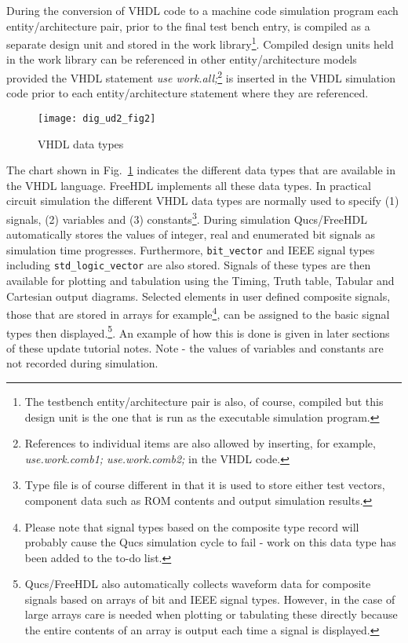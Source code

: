 During the conversion of VHDL code to a machine code simulation program each  entity/architecture pair, prior to the final test bench entry, is compiled as a separate design unit and stored in the work library\footnote{The testbench entity/architecture pair is also, of course, compiled but this design unit is the one that is run as the executable simulation program.}.  Compiled design units held in the work library can be referenced in other entity/architecture models provided the VHDL statement  \textit{use work.all;}\footnote{References to individual items are also allowed by inserting, for example, \textit{use.work.comb1; use.work.comb2;} in the VHDL code.} is inserted in the VHDL simulation code prior to each entity/architecture statement where they are referenced.
\newpage 
{} 


\FloatBarrier 
\begin{figure}[ht] 
  \centering 
  \texttt{[image: dig\_ud2\_fig2]} 
  \caption{VHDL data types} 
  \label{fig:ud2_fig2}
\end{figure} 
\FloatBarrier

The chart shown in Fig.~\ref{fig:ud2_fig2} indicates the different data types that are available in the VHDL language. FreeHDL implements all these data types. In practical circuit simulation the different VHDL data types are normally used to specify (1) signals, (2) variables and (3) constants\footnote{Type file is of course different in that it is used to store either test vectors, component data such as ROM contents and output simulation results.}. During simulation Qucs/FreeHDL automatically stores the values of integer, real and enumerated bit signals as simulation time progresses.  Furthermore, \verb|bit_vector| and IEEE signal types including \verb|std_logic_vector| are also stored.  Signals of these types are then available for plotting and tabulation using the Timing, Truth table, Tabular and Cartesian output diagrams.  Selected elements in user defined composite signals, those that are stored in arrays for example\footnote{Please note that signal types based on the composite type record will probably cause the Qucs simulation cycle to fail - work on this data type has been added to the to-do list.}, can be assigned to the basic signal types then displayed.\footnote{Qucs/FreeHDL also automatically collects waveform data for composite signals based on arrays of bit and IEEE signal types. However, in the case of large arrays care is needed when plotting or tabulating these directly because the entire contents of an array is output each time a signal is displayed.}. An example of how this is done is given in later sections of these update tutorial notes. Note - the values of variables and constants are not recorded during simulation.


